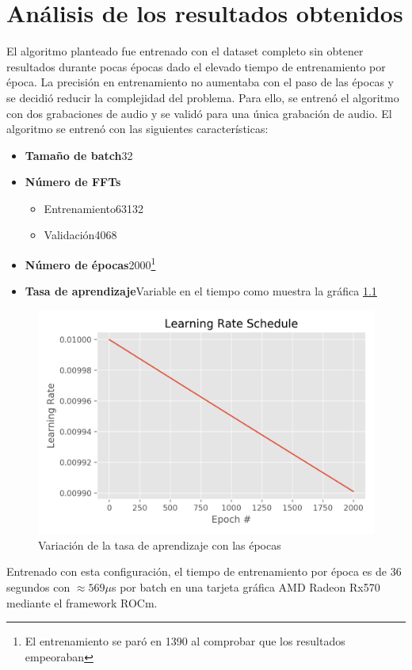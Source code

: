 \chapter{Análisis de los resultados obtenidos}\label{ch: results}
El algoritmo planteado fue entrenado con el dataset completo sin obtener resultados durante pocas épocas dado el elevado tiempo de entrenamiento por época. La precisión en entrenamiento no aumentaba con el paso de las épocas y se decidió reducir la complejidad del problema. Para ello, se entrenó el algoritmo con dos grabaciones de audio y se validó para una única grabación de audio. El algoritmo se entrenó con las siguientes características:
\begin{itemize}
	\item \textbf{Tamaño de batch}32
	\item \textbf{Número de \glspl{FFT}}
	\begin{itemize}
		\item Entrenamiento63132
		\item Validación4068
	\end{itemize}
	\item \textbf{Número de épocas}2000\footnote{El entrenamiento se paró en 1390 al comprobar que los resultados empeoraban}
	\item \textbf{Tasa de aprendizaje}Variable en el tiempo como muestra la gráfica \ref{fig: learning_rate}
\end{itemize}

\begin{figure}[h!]
	\centering
	\includegraphics[width=0.75\columnwidth]{figures/Learning_rate_schedule}
	\caption{Variación de la tasa de aprendizaje con las épocas}
	\label{fig: learning_rate}
\end{figure}

Entrenado con esta configuración, el tiempo de entrenamiento por época es de 36 segundos con $\approx 569\mu$s por batch en una tarjeta gráfica \gls{AMD} Radeon Rx570 mediante el \gls{framework} \gls{ROCm}. 


